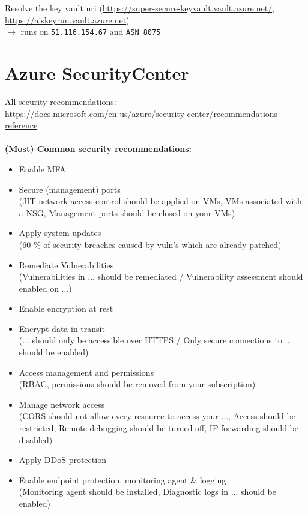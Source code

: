 \documentclass[12pt]{article}
\begin{document}
Resolve the key vault uri (\url{https://super-secure-keyvault.vault.azure.net/}, \url{https://aiskeyrun.vault.azure.net}) \\
$\rightarrow$ runs on \verb|51.116.154.67| and \verb|ASN 8075|


\section*{Azure SecurityCenter}
All security recommendations:\\  \url{https://docs.microsoft.com/en-us/azure/security-center/recommendations-reference} \\ \\
\textbf{(Most) Common security recommendations:}
\begin{itemize}
    \item Enable MFA
    \item Secure (management) ports \\ 
    (JIT network access control should be applied on VMs, VMs associated with a NSG, Management ports should be closed on your VMs)
    \item Apply system updates \\
    (60 \% of security breaches caused by vuln's which are already patched)
    \item Remediate Vulnerabilities \\
    (Vulnerabilities in ... should be remediated / Vulnerability assessment should enabled on ...)
    \item Enable encryption at rest
    \item Encrypt data in transit \\
    (... should only be accessible over HTTPS / Only secure connections to ... should be enabled)
    \item Access management and permissions \\
    (RBAC, permissions should be removed from your subscription)
    \item Manage network access \\
    (CORS should not allow every resource to access your ..., Access should be restricted, Remote debugging should be turned off, IP forwarding should be disabled)
    \item Apply DDoS protection
    \item Enable endpoint protection, monitoring agent \& logging \\
    (Monitoring agent should be installed, Diagnostic logs in ... should be enabled)
\end{itemize}
\end{document}
